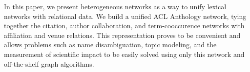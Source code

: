 In this paper, we present heterogeneous networks as a way to unify lexical networks with relational data. We build a unified ACL Anthology network, tying together the citation, author collaboration, and term-cooccurence networks with affiliation and venue relations. This representation proves to be convenient and allows problems such as name disambiguation, topic modeling, and the measurement of scientific impact to be easily solved using only this network and off-the-shelf graph algorithms.

